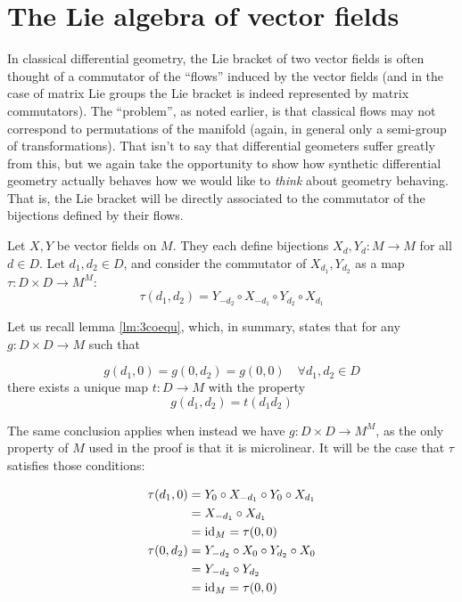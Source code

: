 \section{The Lie algebra of vector fields}

In classical differential geometry, the Lie bracket of two vector fields is often thought of a commutator of the ``flows'' induced by the vector fields (and in the case of matrix Lie groups the Lie bracket is indeed represented by matrix commutators). The ``problem'', as noted earlier, is that classical flows may not correspond to permutations of the manifold (again, in general only a semi-group of transformations). That isn't to say that differential geometers suffer greatly from this, but we again take the opportunity to show how synthetic differential geometry actually behaves how we would like to \emph{think} about geometry behaving. That is, the Lie bracket will be directly associated to the commutator of the bijections defined by their flows.

Let \( X,Y \) be vector fields on \( M \). They each define bijections \( X_d,Y_d:M\to M \) for all \( d\in D \). Let \( d_1,d_2\in D \), and consider the commutator of \( X_{d_1}, Y_{d_2} \) as a map \( \tau:D\times D \to M^M \):
\begin{equation*}
  \tau(d_1,d_2) = Y_{-d_2}\circ X_{-d_1}\circ Y_{d_2}\circ X_{d_1}
\end{equation*}

Let us recall lemma \ref{lm:3coequ}, which, in summary, states that for any \( g:D\times D \to M \) such that

\begin{equation*}
g(d_1,0) = g(0,d_2) = g(0,0) \quad \forall d_1,d_2\in D
\end{equation*}
there exists a unique map \( t:D\to M \) with the property
\begin{equation*}
  g(d_1,d_2) = t(d_1d_2)
\end{equation*}

The same conclusion applies when instead we have \( g:D\times D\to M^M \), as the only property of \( M \) used in the proof is that it is microlinear. It will be the case that \( \tau \) satisfies those conditions:

\begin{align*}
  \tau(d_1,0) &= Y_0\circ X_{-d_1}\circ Y_0\circ X_{d_1} \\
              &= X_{-d_1}\circ X_{d_1}                   \\
	      &= \operatorname{id}_M = \tau(0,0)                       \\
  \tau(0,d_2) &= Y_{-d_2}\circ X_0\circ Y_{d_2}\circ X_0 \\
              &= Y_{-d_2}\circ Y_{d_2}                   \\
	      &= \operatorname{id}_M = \tau(0,0)                       \\
\end{align*}

